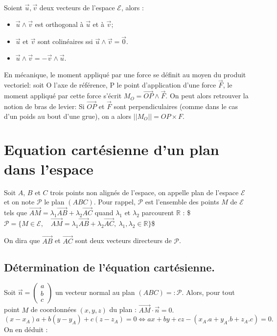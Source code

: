 \documentclass[letterpaper,10pt,english]{jupyterBook}
\begin{document}
\sphinxAtStartPar
{}
Soient \(\vec{u},\vec{v}\)  deux vecteurs de l’espace \(\mathcal{E}\), alors :
\begin{itemize}
\item {} 
\sphinxAtStartPar
\(\vec{u} \wedge \vec{v}\) est orthogonal à \(\vec{u}\) et à \(\vec{v}\);

\item {} 
\sphinxAtStartPar
\(\vec{u}\) et \(\vec{v}\) sont colinéaires ssi \(\vec{u} \wedge \vec{v} =\vec{0}\).

\item {} 
\sphinxAtStartPar
\(\vec{u} \wedge \vec{v} =-\vec{v} \wedge \vec{u}\).

\end{itemize}

\sphinxAtStartPar
{} En mécanique, le moment appliqué par une force se définit au moyen du produit vectoriel: soit O l’axe de référence, P le point d’application d’une force \(\vec{F}\), le moment appliqué par cette force s’écrit \(M_O = \vec{OP} \wedge \vec{F}\). On peut alors retrouver la notion de bras de levier: Si \(\vec{OP}\) et \(\vec{F}\) sont perpendiculaires (comme dans le cas d’un poids au bout d’une grue), on a alors \(||M_O|| = OP \times F\).


\section{Equation cartésienne d’un plan dans l’espace}
\label{\detokenize{Part1/Cours:equation-cartesienne-d-un-plan-dans-l-espace}}
\sphinxAtStartPar
Soit \(A\), \(B\) et \(C\) trois points non alignés de l’espace, on appelle plan de l’espace \(\mathcal{E}\) et on note \(\mathcal{P}\) le plan \((ABC)\). Pour rappel,  \(\mathcal{P}\) est l’ensemble des points \(M\) de \(\mathcal{E}\) tels que \(\vec{AM} = \lambda_1 \vec{AB} + \lambda_2 \vec{AC}\) quand \(\lambda_1\) et \(\lambda_2\) parcourent \(\mathbb{R}\) :
\$\(
\mathcal{P} = \{M \in \mathcal{E},\quad \vec{AM} = \lambda_1 \vec{AB}+\lambda_2 \vec{AC},\ \lambda_1, \lambda_2 \in \mathbb{R}\}
\)\$

\sphinxAtStartPar
On dira que \(\vec{AB}\) et \(\vec{AC}\) sont deux vecteurs directeurs de \(\mathcal{P}\).


\subsection{Détermination de l’équation cartésienne.}
\label{\detokenize{Part1/Cours:determination-de-l-equation-cartesienne}}
\sphinxAtStartPar
Soit \(\vec{n}=\begin{pmatrix}a \\ b \\ c \end{pmatrix}\) un vecteur normal au plan \((ABC) = : \mathcal{P}\). Alors, pour tout point \(M\) de coordonnées \((x,y,z)\) du plan :
\(\vec{AM} \cdot \vec{n} = 0.\)
\(
(x-x_A)a + b(y-y_A) + c(z-z_A) = 0 \Leftrightarrow ax + by + cz - (x_A.a+y_A.b+z_A.c) = 0.
\)
On en déduit :
\end{document}
